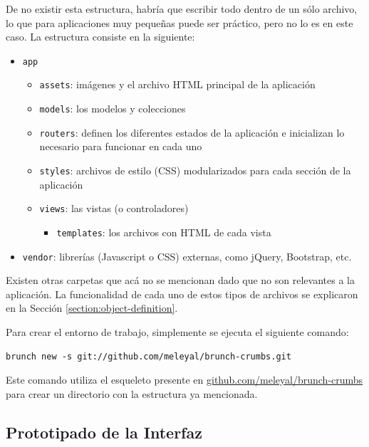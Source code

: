 \documentclass[12pt,spanish,letter]{report}
\begin{document}
De no existir esta estructura, habría que escribir todo dentro de un
sólo archivo, lo que para aplicaciones muy pequeñas puede ser práctico,
pero no lo es en este caso. La estructura consiste en la siguiente:

\begin{itemize}
\item
  \texttt{app}

  \begin{itemize}
  \item
    \texttt{assets}: imágenes y el archivo HTML principal de la
    aplicación
  \item
    \texttt{models}: los modelos y colecciones
  \item
    \texttt{routers}: definen los diferentes estados de la aplicación e
    inicializan lo necesario para funcionar en cada uno
  \item
    \texttt{styles}: archivos de estilo (CSS) modularizados para cada
    sección de la aplicación
  \item
    \texttt{views}: las vistas (o controladores)

    \begin{itemize}
    \item
      \texttt{templates}: los archivos con HTML de cada vista
    \end{itemize}
  \end{itemize}
\item
  \texttt{vendor}: librerías (Javascript o CSS) externas, como jQuery,
  Bootstrap, etc.
\end{itemize}

Existen otras carpetas que acá no se mencionan dado que no son
relevantes a la aplicación. La funcionalidad de cada uno de estos tipos
de archivos se explicaron en la Sección \ref{section:object-definition}.

Para crear el entorno de trabajo, simplemente se ejecuta el siguiente
comando:

\begin{verbatim}
brunch new -s git://github.com/meleyal/brunch-crumbs.git
\end{verbatim}

Este comando utiliza el esqueleto presente en
\href{https://github.com/meleyal/brunch-crumbs}{github.com/meleyal/brunch-crumbs}
para crear un directorio con la estructura ya mencionada.

\subsection{Prototipado de la Interfaz}
\end{document}
